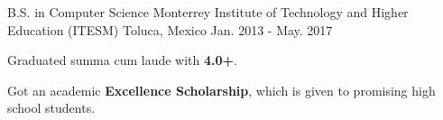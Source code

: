 \begin{cventries}
  \cventry
    {B.S. in Computer Science}
    {Monterrey Institute of Technology and Higher Education (ITESM)}
    {Toluca, Mexico}
    {Jan. 2013 - May. 2017}
    {
      \begin{cvitems}
        \item {Graduated summa cum laude with \textbf{4.0+}. }
        \item {Got an academic \textbf{Excellence Scholarship}, which is given to promising high school students.}
      \end{cvitems}
    }
\end{cventries}
